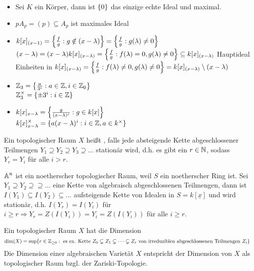 	\begin{itemize}
		\item Sei $K$ ein Körper, dann ist $\setnull$ das einzige echte Ideal und maximal.
		\item $pA_p = (p) \subseteq A_p$ ist maximales Ideal
		\item $k[x]_{(x-1)} = \penbrace*{ \frac{f}{g} : g \notin (x- \lambda)} = \penbrace*{\frac{f}{g} : g(\lambda) \neq 0}$ \\
		$(x-\lambda) = (x - \lambda) k[x]_{(x-\lambda)} = \penbrace*{ \frac{f}{g} : f(\lambda) = 0, g(\lambda) \neq 0} \subseteq k[x]_{(x-\lambda)}$ Hauptideal \\
		Einheiten in $k[x]_{(x-\lambda)} = \penbrace*{ \frac{f}{g} : f(\lambda) \neq 0, g(\lambda) \neq 0} = k[x]_{(x-\lambda)} \setminus (x-\lambda)$
		\item $\ZZ_3 = \penbrace*{ \frac{a}{3^i} : a\in \ZZ, i \in \ZZ_0}$ \\
		$\ZZ_3^\times = \{ \pm 3^i : i \in \ZZ\}$
		\item $k[x]_{x-\lambda} = \penbrace*{ \frac{g}{(x-\lambda)^i} : g \in k[x]}$ \\
		$k[x]_{x - \lambda}^\times = \{a(x-\lambda)^i : i \in \ZZ, a \in k^\times\}$		
	\end{itemize}
	
\begin{defn}
	Ein topologischer Raum $X$ heißt , falls jede absteigende Kette abgeschlossener Teilmengen $Y_1 \supseteq Y_2 \supseteq Y_3 \supseteq \dots$ stationär wird, d.h. es gibt ein $r \in \NN$, sodass $Y_r = Y_i$ für alle $i > r$.
\end{defn}

	$\aff^n$ ist ein noetherscher topologischer Raum, weil $S$ ein noetherscher Ring ist. Sei $Y_1 \supseteq Y_2 \supseteq \supseteq \dots$ eine Kette von algebraisch abgeschlossenen Teilmengen, dann ist $I(Y_1) \subseteq I(Y_2) \subseteq \dots$ aufsteigende Kette von Idealen in $S = k[\underline{x}]$ und wird stationär, d.h. $I(Y_r) = I(Y_i)$ für $i \geq r \Rightarrow Y_r = Z(I(Y_i)) = Y_i = Z(I(Y_i))$ für alle $i \geq r$.
	
\begin{defn}
	Ein topologischer Raum $X$ hat die Dimension
	\[ \dim(X) = \sup \{r \in \ZZ_{\geq 0} : \text{ es ex. Kette } Z_0 \subsetneq Z_1 \subsetneq \dots \subsetneq Z_r \text{ von irreduziblen abgeschlossenen Teilmengen } Z_i \} \]
	Die Dimension einer algebraischen Varietät $X$ entspricht der Dimension von $X$ als topologischer Raum bzgl. der Zariski-Topologie.
\end{defn}	
	
